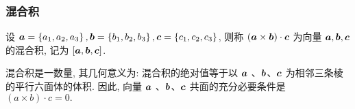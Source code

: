 % 
% 
% 
% 

\subsubsection{混合积}

\begin{definition}[向量的混合积]
    设 $ \vb*{a}=\left\{a_{1}, a_{2}, a_{3}\right\}, \vb*{b}=\left\{b_{1}, b_{2}, b_{3}\right\}, \vb*{c}=\left\{c_{1}, c_{2}, c_{3}\right\}$, 
    则称 $ (\vb*{a} \times \vb*{b}) \cdot \vb*{c} $ 为向量 $ \vb*{a}, \vb*{b}, \vb*{c} $ 的混合积, 记为 $ [\vb*{a}, \vb*{b}, \vb*{c}] $.
\end{definition}

\begin{theorem}[共面条件]
    混合积是一数量, 其几何意义为: 混合积的绝对值等于以 $ \vb*{a}$ 、$ \vb*{b} $、$ \vb*{c} $ 为相邻三条棱的平行六面体的体积.
    因此, 向量 $ \vb*{a}$ 、$ \vb*{b} $、$ \vb*{c} $ 共面的充分必要条件是 $ (a \times b) \cdot c=0 .$
\end{theorem}
